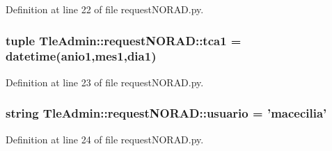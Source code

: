 \-Definition at line 22 of file request\-N\-O\-R\-A\-D.\-py.

\subsubsection[{tca1}]{\setlength{\rightskip}{0pt plus 5cm}tuple {\bf \-Tle\-Admin\-::request\-N\-O\-R\-A\-D\-::tca1} = datetime({\bf anio1},{\bf mes1},{\bf dia1})}\label{namespace_tle_admin_1_1request_n_o_r_a_d_a74199c02acb40285e6fd5a7553f8484e}


\-Definition at line 23 of file request\-N\-O\-R\-A\-D.\-py.

\subsubsection[{usuario}]{\setlength{\rightskip}{0pt plus 5cm}string {\bf \-Tle\-Admin\-::request\-N\-O\-R\-A\-D\-::usuario} = 'macecilia'}\label{namespace_tle_admin_1_1request_n_o_r_a_d_aa0ff805175f46976ae88a9f191433edd}


\-Definition at line 24 of file request\-N\-O\-R\-A\-D.\-py.


